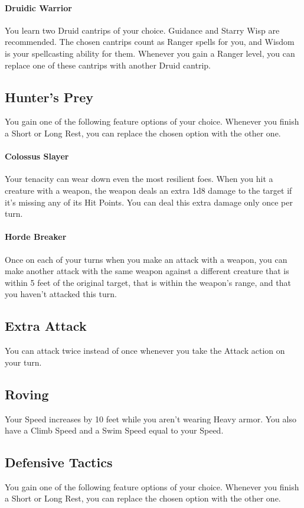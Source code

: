 \documentclass[letterpaper,openany,oneside,twocolumn]{book}
\begin{document}
\paragraph*{Druidic Warrior} You learn two Druid cantrips of your choice. Guidance and Starry Wisp are recommended. The chosen cantrips count as Ranger spells for you, and Wisdom is your spellcasting ability for them. Whenever you gain a Ranger level, you can replace one of these cantrips with another Druid cantrip.
\subsection*{Hunter's Prey}
You gain one of the following feature options of your choice. Whenever you finish a Short or Long Rest, you can replace the chosen option with the other one.

\paragraph*{Colossus Slayer} Your tenacity can wear down even the most resilient foes. When you hit a creature with a weapon, the weapon deals an extra 1d8 damage to the target if it's missing any of its Hit Points. You can deal this extra damage only once per turn.

\paragraph*{Horde Breaker} Once on each of your turns when you make an attack with a weapon, you can make another attack with the same weapon against a different creature that is within 5 feet of the original target, that is within the weapon's range, and that you haven't attacked this turn.
\subsection*{Extra Attack}
You can attack twice instead of once whenever you take the Attack action on your turn.
\subsection*{Roving}
Your Speed increases by 10 feet while you aren't wearing Heavy armor. You also have a Climb Speed and a Swim Speed equal to your Speed.
\subsection*{Defensive Tactics}
You gain one of the following feature options of your choice. Whenever you finish a Short or Long Rest, you can replace the chosen option with the other one.
\end{document}
